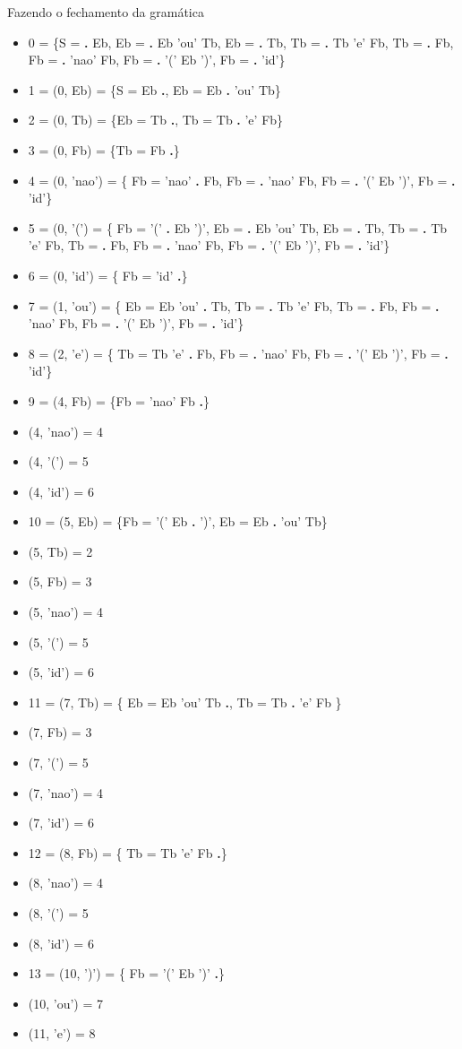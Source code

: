 \documentclass[11pt]{article}
\begin{document}
Fazendo o fechamento da gramática
\begin{itemize}
\item 0 = \{S = \textbf{.} Eb, Eb = \textbf{.} Eb 'ou' Tb, Eb = \textbf{.} Tb, Tb = \textbf{.} Tb
'e' Fb, Tb = \textbf{.} Fb, Fb = \textbf{.} 'nao' Fb, Fb = \textbf{.} '(' Eb ')', Fb
= \textbf{.} 'id'\}
\item 1 = (0, Eb) = \{S = Eb \textbf{.}, Eb = Eb \textbf{.} 'ou' Tb\}
\item 2 = (0, Tb) = \{Eb = Tb \textbf{.}, Tb = Tb \textbf{.} 'e' Fb\}
\item 3 = (0, Fb) = \{Tb = Fb \textbf{.}\}
\item 4 = (0, 'nao') = \{ Fb = 'nao' \textbf{.} Fb, Fb = \textbf{.} 'nao' Fb, Fb =
\textbf{.} '(' Eb ')', Fb = \textbf{.} 'id'\}
\item 5 = (0, '(') = \{ Fb = '(' \textbf{.} Eb ')', Eb = \textbf{.} Eb 'ou' Tb, 
Eb = \textbf{.} Tb, Tb = \textbf{.} Tb 'e' Fb, Tb = \textbf{.} Fb, 
Fb = \textbf{.} 'nao' Fb, Fb = \textbf{.} '(' Eb ')', Fb = \textbf{.} 'id'\}
\item 6 = (0, 'id') = \{ Fb = 'id' \textbf{.}\}
\item 7 = (1, 'ou') = \{ Eb = Eb 'ou' \textbf{.} Tb, Tb = \textbf{.} Tb
'e' Fb, Tb = \textbf{.} Fb, Fb = \textbf{.} 'nao' Fb, Fb = \textbf{.} '(' Eb ')', Fb
= \textbf{.} 'id'\}
\item 8 = (2, 'e') = \{ Tb = Tb 'e' \textbf{.} Fb, Fb = \textbf{.} 'nao' Fb,
Fb = \textbf{.} '(' Eb ')', Fb = \textbf{.} 'id'\}
\item 9 = (4, Fb) = \{Fb = 'nao' Fb \textbf{.}\}
\item (4, 'nao') = 4
\item (4, '(') = 5
\item (4, 'id') = 6
\item 10 = (5, Eb) = \{Fb = '(' Eb \textbf{.} ')', Eb = Eb \textbf{.} 'ou' Tb\}
\item (5, Tb) = 2
\item (5, Fb) = 3
\item (5, 'nao') = 4
\item (5,  '(') = 5
\item (5, 'id') = 6
\item 11 = (7, Tb) = \{ Eb = Eb 'ou' Tb \textbf{.}, Tb = Tb \textbf{.} 'e' Fb \}
\item (7, Fb) = 3
\item (7, '(') = 5
\item (7, 'nao') = 4
\item (7, 'id') = 6
\item 12 = (8, Fb) = \{ Tb = Tb 'e' Fb \textbf{.}\}
\item (8, 'nao') = 4
\item (8, '(') = 5
\item (8, 'id') = 6
\item 13 = (10, ')') = \{ Fb = '(' Eb ')' \textbf{.}\}
\item (10, 'ou') = 7
\item (11, 'e') = 8
\end{itemize}
\end{document}
